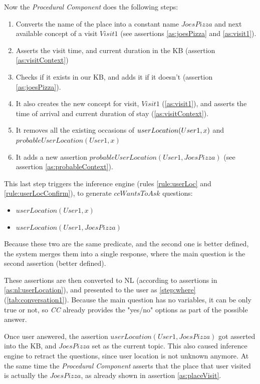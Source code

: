 Now the \emph{Procedural Component} does the following steps:
\begin{enumerate}
\item Converts the name of the place into a constant name $JoesPizza$ and next
available concept of a visit $Visit1$ (see assertions \ref{as:joesPizza} and
\ref{as:visit1}).
\item Asserts the visit time, and current duration in the KB (assertion 
\ref{as:visitContext})
\item Checks if it exists in our KB, and adds it if it doesn't (assertion 
\ref{as:joesPizza}). 
\item It also creates the new concept for visit, $Visit1$ (\ref{as:visit1}),
and asserts the time of arrival and current duration of stay 
(\ref{as:visitContext}).
\item It removes all the existing occasions of $\\userLocation(User1,x)$ and 
$probableUserLocation(User1,x)$
\item It adds a new assertion $probableUserLocation(User1,JoesPizza)$ 
(see assertion \ref{as:probableContext}).
\end{enumerate}
This last step triggers the inference engine (rules \ref{rule:userLoc} and
\ref{rule:userLocConfirm}), to generate $ccWantsToAsk$ questions:
\begin{itemize}
\item $userLocation(User1,x)$
\item $userLocation(User1,JoesPizza)$
\end{itemize}
Because these two are the same predicate, and the second one is better defined,
the system merges them into a single response, where the main question is the
second assertion (better defined). 

These assertions are then converted to NL (according to assertions in 
\ref{as:nl:userLocation}), and presented to the user as \autoref{step:where} 
(\autoref{tab:conversation1}). Because the main question has no variables, it
can be only true or not, so \emph{CC} already provides the "yes/no" options
as part of the possible answer.

Once user answered, the assertion $userLocation(User1,JoesPizza)$ got 
asserted into the KB, and $JoesPizza$ set as the current topic. This 
also caused inference engine to retract the 
questions, since user location is not unknown anymore. At the same time the
\emph{Procedural Component}  asserts that the place that user visited is
actually the $JoesPizza$, as already shown in assertion \ref{as:placeVisit}.


